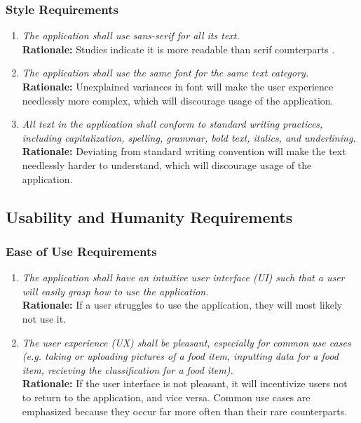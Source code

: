 \documentclass[]{article}
\begin{document}
\subsubsection{Style Requirements}
\label{ssub:style_requirements}
\begin{enumerate}[{LF-S}1. ]
    \item \textit{The application shall use sans-serif for all its text.} \\ \textbf{Rationale:} Studies indicate it is more readable than serif counterparts \cite{Adobe}.
    \item \textit{The application shall use the same font for the same text category.} \\ \textbf{Rationale:} Unexplained variances in font will make the user experience needlessly more complex, which will discourage usage of the application.
    \item \textit{All text in the application shall conform to standard writing practices, including capitalization, spelling, grammar, bold text, italics, and underlining.} \\ \textbf{Rationale:} Deviating from standard writing convention will make the text needlessly harder to understand, which will discourage usage of the application.
\end{enumerate}


\subsection{Usability and Humanity Requirements}
\label{sub:usability_and_humanity_requirements}

\subsubsection{Ease of Use Requirements}
\label{ssub:ease_of_use_requirements}
\begin{enumerate}[{UH-EOU}1. ]
    \item \textit{The application shall have an intuitive user interface (UI) such that a user will easily grasp how to use the application.} \\ \textbf{Rationale:} If a user struggles to use the application, they will most likely not use it.
    \item \textit{The user experience (UX) shall be pleasant, especially for common use cases (e.g. taking or uploading pictures of a food item, inputting data for a food item, recieving the classification for a food item).}  \\ \textbf{Rationale:} If the user interface is not pleasant, it will incentivize users not to return to the application, and vice versa. Common use cases are emphasized because they occur far more often than their rare counterparts.
\end{enumerate}
\end{document}
